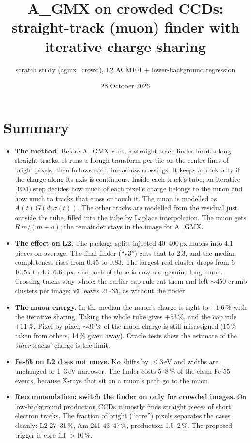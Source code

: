 \documentclass[10pt]{article}
\title{\vspace{-1.2cm}\textbf{A\_GMX on crowded CCDs: straight-track (muon) finder with iterative charge sharing}}
\author{scratch study (agmx\_crowd), L2 ACM101 + lower-background regression}
\date{28 October 2026}
\begin{document}
\maketitle\vspace{-0.6cm}

\section*{Summary}
\begin{itemize}
\item \textbf{The method.} Before A\_GMX runs, a straight-track finder locates long straight tracks. It runs a Hough transform per tile on the centre lines of bright pixels, then follows each line across crossings. It keeps a track only if the charge along its axis is continuous. Inside each track's tube, an iterative (EM) step decides how much of each pixel's charge belongs to the muon and how much to tracks that cross or touch it. The muon is modelled as $A(t)\,G(d;\sigma(t))$. The other tracks are modelled from the residual just outside the tube, filled into the tube by Laplace interpolation. The muon gets $R\,m/(m+o)$; the remainder stays in the image for A\_GMX.
\item \textbf{The effect on L2.} The package splits injected 40--400\,px muons into 4.1 pieces on average. The final finder (``v3'') cuts that to 2.3, and the median completeness rises from 0.45 to 0.83. The largest real cluster drops from 6--10.5k to 4.9--6.6k\,px, and each of these is now one genuine long muon. Crossing tracks stay whole: the earlier cap rule cut them and left $\sim$450 crumb clusters per image; v3 leaves 21--35, as without the finder.
\item \textbf{The muon energy.} In the median the muon's charge is right to $+1.6$\,\% with the iterative sharing. Taking the whole tube gives $+53$\,\%, and the cap rule $+11$\,\%. Pixel by pixel, $\sim$30\,\% of the muon charge is still misassigned (15\,\% taken from others, 14\,\% given away). Oracle tests show the estimate of the \emph{other} tracks' charge is the limit.
\item \textbf{Fe-55 on L2 does not move.} K$\alpha$ shifts by $\le 3$\,eV and widths are unchanged or 1--3\,eV narrower. The finder costs 5--8\,\% of the clean Fe-55 events, because X-rays that sit on a muon's path go to the muon.
\item \textbf{Recommendation: switch the finder on only for crowded images.} On low-background production CCDs it mostly finds straight pieces of short electron tracks. The fraction of bright (``core'') pixels separates the cases cleanly: L2 27--31\,\%, Am-241 43--47\,\%, production 1.5--2\,\%. The proposed trigger is core fill $>10$\,\%.
\end{itemize}
\end{document}
